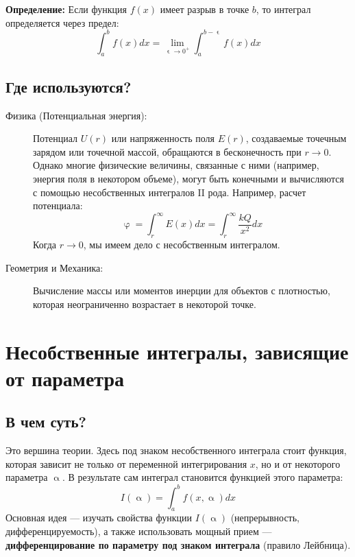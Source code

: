 \documentclass[a4paper, 12pt]{report}
\numberwithin{equation}{section}
\renewcommand{\alpha}{\upalpha}
\renewcommand{\varphi}{\upvarphi}
\renewcommand{\varepsilon}{\upvarepsilon}
\begin{document}
\textbf{Определение:} Если функция $f(x)$ имеет разрыв в точке $b$, то интеграл определяется через предел:
\begin{equation*}
	\int_{a}^{b} f(x) dx = \lim_{\varepsilon \to 0^+} \int_{a}^{b-\varepsilon} f(x) dx
\end{equation*}

\subsection{Где используются?}
\begin{description}
	\item[Физика (Потенциальная энергия):] Потенциал $U(r)$ или напряженность поля $E(r)$, создаваемые точечным зарядом или точечной массой, обращаются в бесконечность при $r \to 0$. Однако многие физические величины, связанные с ними (например, энергия поля в некотором объеме), могут быть конечными и вычисляются с помощью несобственных интегралов II рода. Например, расчет потенциала:
	$$ \varphi = \int_{r}^{\infty} E(x) dx = \int_{r}^{\infty} \frac{kQ}{x^2} dx $$
	Когда $r \to 0$, мы имеем дело с несобственным интегралом.
	
	\item[Геометрия и Механика:] Вычисление массы или моментов инерции для объектов с плотностью, которая неограниченно возрастает в некоторой точке.
\end{description}

\section{Несобственные интегралы, зависящие от параметра}
\subsection{В чем суть?}
Это вершина теории. Здесь под знаком несобственного интеграла стоит функция, которая зависит не только от переменной интегрирования $x$, но и от некоторого параметра $\alpha$. В результате сам интеграл становится функцией этого параметра:
$$ I(\alpha) = \int_{a}^{b} f(x, \alpha) dx $$
Основная идея — изучать свойства функции $I(\alpha)$ (непрерывность, дифференцируемость), а также использовать мощный прием — \textbf{дифференцирование по параметру под знаком интеграла} (правило Лейбница).
\end{document}
